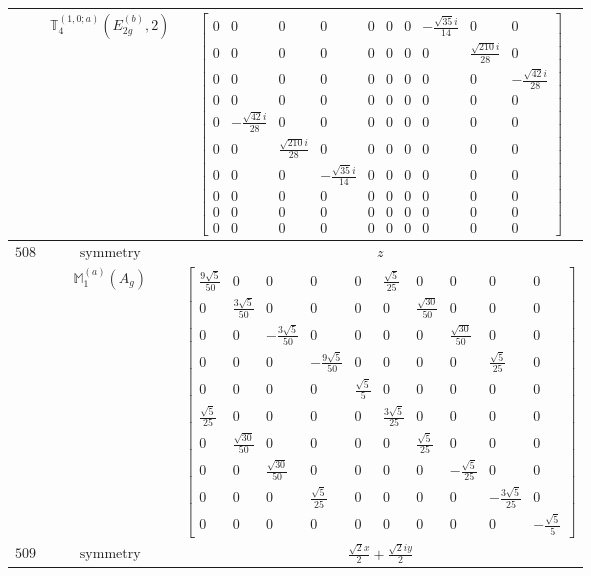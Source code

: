 \documentclass[fleqn,8pt,landscape]{jsarticle}
\begin{document}
\begin{longtable}{ccc}
$  $ & $ \mathbb{T}_{4}^{(1,0;a)}(E_{2g}^{(b)},2) $ & $ \begin{bmatrix} 0 & 0 & 0 & 0 & 0 & 0 & 0 & - \frac{\sqrt{35} i}{14} & 0 & 0 \\ 0 & 0 & 0 & 0 & 0 & 0 & 0 & 0 & \frac{\sqrt{210} i}{28} & 0 \\ 0 & 0 & 0 & 0 & 0 & 0 & 0 & 0 & 0 & - \frac{\sqrt{42} i}{28} \\ 0 & 0 & 0 & 0 & 0 & 0 & 0 & 0 & 0 & 0 \\ 0 & - \frac{\sqrt{42} i}{28} & 0 & 0 & 0 & 0 & 0 & 0 & 0 & 0 \\ 0 & 0 & \frac{\sqrt{210} i}{28} & 0 & 0 & 0 & 0 & 0 & 0 & 0 \\ 0 & 0 & 0 & - \frac{\sqrt{35} i}{14} & 0 & 0 & 0 & 0 & 0 & 0 \\ 0 & 0 & 0 & 0 & 0 & 0 & 0 & 0 & 0 & 0 \\ 0 & 0 & 0 & 0 & 0 & 0 & 0 & 0 & 0 & 0 \\ 0 & 0 & 0 & 0 & 0 & 0 & 0 & 0 & 0 & 0 \end{bmatrix} $ \\ \hline
$ 508 $ & $ \text{symmetry} $ & $ z $ \\
$  $ & $ \mathbb{M}_{1}^{(a)}(A_{g}) $ & $ \begin{bmatrix} \frac{9 \sqrt{5}}{50} & 0 & 0 & 0 & 0 & \frac{\sqrt{5}}{25} & 0 & 0 & 0 & 0 \\ 0 & \frac{3 \sqrt{5}}{50} & 0 & 0 & 0 & 0 & \frac{\sqrt{30}}{50} & 0 & 0 & 0 \\ 0 & 0 & - \frac{3 \sqrt{5}}{50} & 0 & 0 & 0 & 0 & \frac{\sqrt{30}}{50} & 0 & 0 \\ 0 & 0 & 0 & - \frac{9 \sqrt{5}}{50} & 0 & 0 & 0 & 0 & \frac{\sqrt{5}}{25} & 0 \\ 0 & 0 & 0 & 0 & \frac{\sqrt{5}}{5} & 0 & 0 & 0 & 0 & 0 \\ \frac{\sqrt{5}}{25} & 0 & 0 & 0 & 0 & \frac{3 \sqrt{5}}{25} & 0 & 0 & 0 & 0 \\ 0 & \frac{\sqrt{30}}{50} & 0 & 0 & 0 & 0 & \frac{\sqrt{5}}{25} & 0 & 0 & 0 \\ 0 & 0 & \frac{\sqrt{30}}{50} & 0 & 0 & 0 & 0 & - \frac{\sqrt{5}}{25} & 0 & 0 \\ 0 & 0 & 0 & \frac{\sqrt{5}}{25} & 0 & 0 & 0 & 0 & - \frac{3 \sqrt{5}}{25} & 0 \\ 0 & 0 & 0 & 0 & 0 & 0 & 0 & 0 & 0 & - \frac{\sqrt{5}}{5} \end{bmatrix} $ \\ \hline
$ 509 $ & $ \text{symmetry} $ & $ \frac{\sqrt{2} x}{2} + \frac{\sqrt{2} i y}{2} $ \\

\end{longtable}
\end{document}
